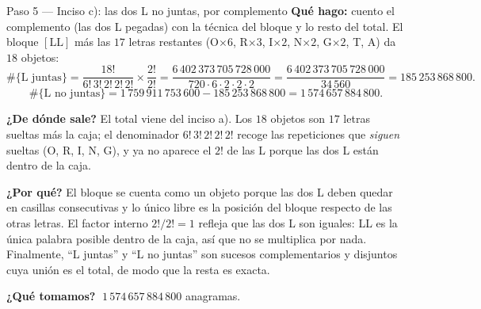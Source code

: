 \documentclass[11pt]{article}
\begin{document}
\begin{paso}{Paso 5 --- Inciso c): las dos L no juntas, por complemento}
\textbf{Qué hago:} cuento el complemento (las dos L pegadas) con la técnica del bloque y lo resto del
total. El bloque $[\text{LL}]$ más las $17$ letras restantes (O$\times6$, R$\times3$, I$\times2$,
N$\times2$, G$\times2$, T, A) da $18$ objetos:
\[
\#\{\text{L juntas}\}=\frac{18!}{6!\,3!\,2!\,2!\,2!}\times\frac{2!}{2!}
=\frac{6\,402\,373\,705\,728\,000}{720\cdot6\cdot2\cdot2\cdot2}
=\frac{6\,402\,373\,705\,728\,000}{34\,560}=185\,253\,868\,800 .
\]
\[
\#\{\text{L no juntas}\}=1\,759\,911\,753\,600-185\,253\,868\,800=1\,574\,657\,884\,800 .
\]

\textbf{¿De dónde sale?} El total viene del inciso a). Los $18$ objetos son $17$ letras sueltas más la
caja; el denominador $6!\,3!\,2!\,2!\,2!$ recoge las repeticiones que \emph{siguen} sueltas (O, R, I, N,
G), y ya no aparece el $2!$ de las L porque las dos L están dentro de la caja.

\textbf{¿Por qué?} El bloque se cuenta como un objeto porque las dos L deben quedar en casillas
consecutivas y lo único libre es la posición del bloque respecto de las otras letras. El factor interno
$2!/2!=1$ refleja que las dos L son iguales: LL es la única palabra posible dentro de la caja, así que no
se multiplica por nada. Finalmente, ``L juntas'' y ``L no juntas'' son sucesos complementarios y disjuntos
cuya unión es el total, de modo que la resta es exacta.

\textbf{¿Qué tomamos?} $\;1\,574\,657\,884\,800$ anagramas.
\end{paso}
\end{document}
